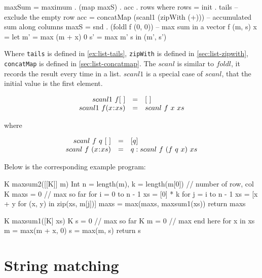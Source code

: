 \documentclass[b5paper]{article}
\begin{document}
\begin{Answer}[ref = {ex:max-subsum}]
{\begin{Haskell}
maxSum = maximum . (map maxS) . acc . rows where
    rows = init . tails              -- exclude the empty row
    acc = concatMap (scanl1 (zipWith (+))) -- accumulated sum along columns
    maxS = snd . (foldl f (0, 0))    -- max sum in a vector
    f (m, s) x = let m' = max (m + x) 0
                     s' = max m' s in (m', s')
\end{Haskell}

Where \texttt{tails} is defined in \cref{ex:list-tails}, \texttt{zipWith} is defined in \cref{sec:list-zipwith}, \texttt{concatMap} is defined in \cref{sec:list-concatmap}. The $scanl$ is similar to $foldl$, it records the result every time in a list. $scanl1$ is a special case of $scanl$, that the initial value is the first element.

\[
\begin{array}{rcl}
scanl1\ f [\ ] & = & [\ ] \\
scanl1\ f (x \mathbin{\!:\!} xs) & = & scanl\ f\ x\ xs \\
\end{array}
\]

where

\[
\begin{array}{rcl}
scanl\ f\ q\ [\ ] & = & [q] \\
scanl\ f\ (x \mathbin{\!:\!} xs) & = & q : scanl\ f\ (f\ q\ x)\ xs \\
\end{array}
\]

Below is the corresponding example program:

\begin{Bourbaki}
K maxsum2([[K]] m) {
    Int n = length(m), k = length(m[0]) // number of row, col
    K maxs = 0            // max so far
    for i = 0 to n - 1 {
        xs = [0] * k
        for j = i to n - 1 {
            xs = [x + y for (x, y) in zip(xs, m[j])]
            maxs = max(maxs, maxsum1(xs))
        }
    }
    return maxs
}

K maxsum1([K] xs) {
    K s = 0 // max so far
    K m = 0 // max end here
    for x in xs {
        m = max(m + x, 0)
        s = max(m, s)
    }
    return s
}
\end{Bourbaki}
}
\end{Answer}

\section{String matching}
\end{document}
